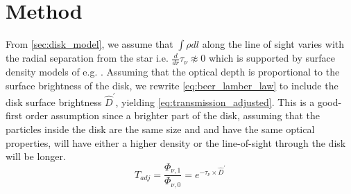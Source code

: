 \documentclass{aa}
\begin{document}





\section{Method}
\label{sec:method}

From \autoref{sec:disk_model}, we assume that $\int \rho dl$ along the line of sight varies with the radial separation from the star i.e. $\frac{d}{dr}\tau_{\nu} \napprox 0$ which is supported by surface density models of e.g. \cite{krivov2010debris}. 
Assuming that the optical depth is proportional to the surface brightness of the disk, we rewrite \autoref{eq:beer_lamber_law} to include the disk surface brightness $\hat{D}^{\prime}$, yielding \autoref{eq:transmission_adjusted}. This is a good-first order assumption since a brighter part of the disk, assuming that the particles inside the disk are the same size and and have the same optical properties, will have either a higher density or the line-of-sight through the disk will be longer.
\begin{equation}
\label{eq:transmission_adjusted}
    T_{adj}=\frac{\Phi_{\nu,1}}{\Phi_{\nu,0}}=e^{-\tau_{\nu} \times \hat{D}^{\prime}}
\end{equation}
\end{document}

